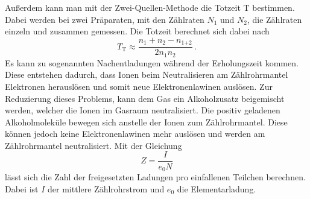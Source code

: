 Außerdem kann man mit der Zwei-Quellen-Methode die Totzeit $\text{T}$ bestimmen. 
Dabei werden bei zwei Präparaten, mit den Zählraten $N_1$ und $N_2$, die Zählraten einzeln und zusammen gemessen.
Die Totzeit berechnet sich dabei nach
\begin{equation}
  T_\text{T} \approx \frac{n_1 +n_2 -n_\text{1+2}}{2n_1 n_2} \, .
  \label{eqn:totzeit}
\end{equation}
Es kann zu sogenannten Nachentladungen während der Erholungszeit kommen. Diese entstehen dadurch, dass Ionen beim Neutralisieren am Zählrohrmantel
Elektronen herauslösen und somit neue Elektronenlawinen auslösen. Zur Reduzierung dieses Problems, kann dem Gas ein Alkoholzusatz beigemischt werden, welcher die 
Ionen im Gasraum neutralisiert. Die positiv geladenen Alkoholmoleküle bewegen sich anstelle der Ionen zum Zählrohrmantel. Diese können jedoch keine Elektronenlawinen mehr auslösen und werden am Zählrohrmantel neutralisiert.
Mit der Gleichung 
\begin{equation}
  Z=\frac{I}{e_0 N}
  \label{eqn:zstrom}
\end{equation}
lässt sich die Zahl der freigesetzten Ladungen pro einfallenen Teilchen berechnen. Dabei ist $I$ der mittlere Zählrohrstrom und $e_0$ die Elementarladung.
